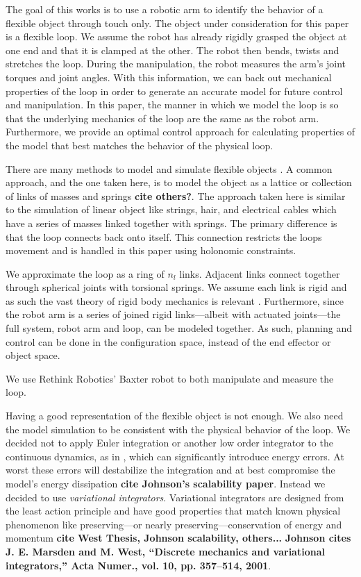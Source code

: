 \documentclass[letterpaper, 10pt, conference]{ieeeconf}
\begin{document}
The goal of this works is to use a robotic arm to identify the behavior of a flexible object through touch only.  The object under consideration for this paper is a flexible loop.  We assume the robot has already rigidly grasped the object at one end and that it is clamped at the other.  The robot then bends, twists and stretches the loop.  During the manipulation, the robot measures the arm's joint torques and joint angles.  With this information, we can back out mechanical properties of the loop in order to generate an accurate model for future control and manipulation.  In this paper, the manner in which we model the loop is so that the underlying mechanics of the loop are the same as the robot arm.  Furthermore, we provide an optimal control approach for calculating properties of the model that best matches the behavior of the physical loop.

There are many methods to model and simulate flexible objects \cite{khalil_payeur}.  A common approach, and the one taken here, is to model the object as a lattice or collection of links of masses and springs \cite{sahari_etal, wakamatsu_etal}\textbf{cite others?}.   The approach taken here is similar to the simulation of linear object like strings, hair, and electrical cables which have a series of masses linked together with springs.  The primary difference is that the loop connects back onto itself.  This connection restricts the loops movement and is handled in this paper using holonomic constraints.  

We approximate the loop as a ring of $n_l$ links.  Adjacent links connect together through spherical joints with torsional springs. We assume each link is rigid and as such the vast theory of rigid body mechanics is relevant \cite{murray_li_sastry}.  Furthermore, since the robot arm is a series of joined rigid links---albeit with actuated joints---the full system, robot arm and loop, can be modeled together.  As such, planning and control can be done in the configuration space, instead of the end effector or object space. 

We use Rethink Robotics' Baxter robot to both manipulate and measure the loop.  

Having a good representation of the flexible object is not enough.  We also need the model simulation to be consistent with the physical behavior of the loop.  We decided not to apply Euler integration or another low order integrator to the continuous dynamics, as in \cite{sahari_etal}, which can significantly introduce energy errors.  At worst these errors will destabilize the integration and at best compromise the model's energy dissipation \textbf{cite Johnson's scalability paper}.  Instead we decided to use \emph{variational integrators}.  Variational integrators are designed from the least action principle and have good properties that match known physical phenomenon like preserving---or nearly preserving---conservation of energy and momentum \textbf{cite West Thesis, Johnson scalability, others...} \textbf{Johnson cites J. E. Marsden and M. West, “Discrete mechanics and variational integrators,” Acta Numer., vol. 10, pp. 357–514, 2001}.  
\end{document}
